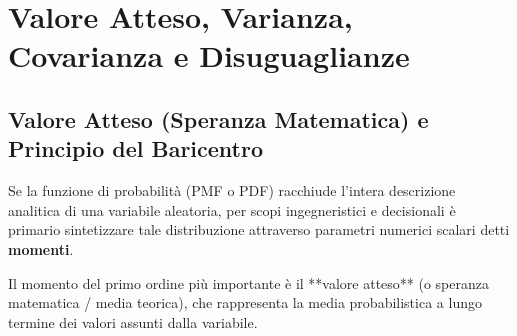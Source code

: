 \chapter{Valore Atteso, Varianza, Covarianza e Disuguaglianze}
\label{cap:valore_atteso_e_varianza}

\begin{abstract}
Il presente capitolo sviluppa la teoria dei momenti e dei parametri sintetici che governano il comportamento probabilistico delle variabili aleatorie. Viene definito rigorosamente l'operatore lineare di speranza matematica $\mathbb{E}[\cdot]$, fornendo la giustificazione analitica della formula del trasferimento (LOTUS) e dimostrando la proprietà fondamentale dell'additività universale. Si analizzano la varianza teorica (con dimostrazione del Teorema di König-Huygens), la deviazione standard, la covarianza e la correlazione teorica $\rho$ intesa come coseno geometrico nello spazio $L^2$. Il capitolo culmina con le dimostrazioni analitiche complete delle disuguaglianze di concentrazione di Markov e di Chebyshev, pietre miliari per la convergenza stocastica e la Legge dei Grandi Numeri.
\end{abstract}

\section{Valore Atteso (Speranza Matematica) e Principio del Baricentro}
\label{sec:valore_atteso_teoria}

Se la funzione di probabilità (PMF o PDF) racchiude l'intera descrizione analitica di una variabile aleatoria, per scopi ingegneristici e decisionali è primario sintetizzare tale distribuzione attraverso parametri numerici scalari detti \textbf{momenti}.

Il momento del primo ordine più importante è il **valore atteso** (o speranza matematica / media teorica), che rappresenta la media probabilistica a lungo termine dei valori assunti dalla variabile.

